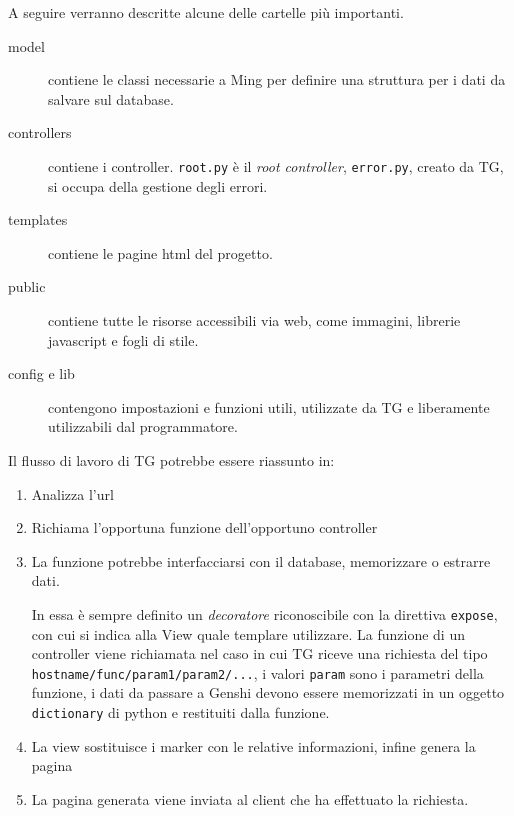 A seguire verranno descritte alcune delle cartelle più importanti.
\begin{description}
\item[model] contiene le classi necessarie a Ming per definire una struttura per i dati da salvare sul database.
\item[controllers] contiene i controller. \texttt{root.py} è il \emph{root controller}, \texttt{error.py}, creato da TG, si occupa della gestione degli errori.
\item[templates] contiene le pagine html del progetto.
\item[public] contiene tutte le risorse accessibili via web, come immagini, librerie javascript e fogli di stile.
\item[config e lib] contengono impostazioni e funzioni utili, utilizzate da TG e liberamente utilizzabili dal programmatore.
\end{description}

Il flusso di lavoro di TG potrebbe essere riassunto in:
\begin{enumerate}
\item Analizza l'url
\item Richiama l'opportuna funzione dell'opportuno controller
\item La funzione potrebbe interfacciarsi con il database, memorizzare o estrarre dati. 

In essa è sempre definito un \emph{decoratore} riconoscibile con la direttiva \texttt{expose}, con cui si indica alla View quale templare utilizzare. La funzione di un controller viene richiamata nel caso in cui TG riceve una richiesta del tipo \texttt{hostname/func/param1/param2/...}, i valori \texttt{param} sono i parametri della funzione, i dati da passare a Genshi devono essere memorizzati in un oggetto \texttt{dictionary} di python e restituiti dalla funzione. 
\item La view sostituisce i marker con le relative informazioni, infine genera la pagina
\item La pagina generata viene inviata al client che ha effettuato la richiesta.
\end{enumerate}

		
